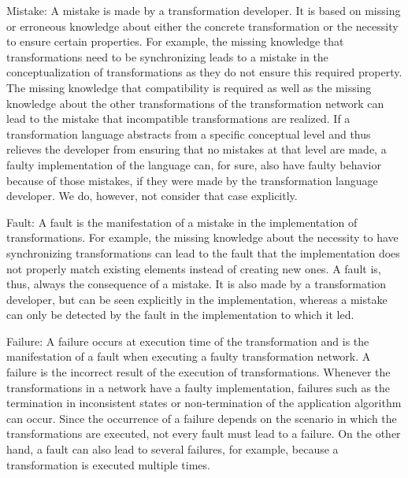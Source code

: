 \begin{properdescription}
    \item[Mistake:] 
    A mistake is made by a transformation developer. It is based on missing or erroneous knowledge about either the concrete transformation or the necessity to ensure certain properties. For example, the missing knowledge that transformations need to be synchronizing leads to a mistake in the conceptualization of transformations as they do not ensure this required property. The missing knowledge that compatibility is required as well as the missing knowledge about the other transformations of the transformation network can lead to the mistake that incompatible transformations are realized.
    If a transformation language abstracts from a specific conceptual level and thus relieves the developer from ensuring that no mistakes at that level are made, a faulty implementation of the language can, for sure, also have faulty behavior because of those mistakes, if they were made by the transformation language developer. We do, however, not consider that case explicitly. 
    \item[Fault:] 
    A fault is the manifestation of a mistake in the implementation of transformations. For example, the missing knowledge about the necessity to have synchronizing transformations can lead to the fault that the implementation does not properly match existing elements instead of creating new ones. A fault is, thus, always the consequence of a mistake. It is also made by a transformation developer, but can be seen explicitly in the implementation, whereas a mistake can only be detected by the fault in the implementation to which it led.
    \item[Failure:] 
    A failure occurs at execution time of the transformation and is the manifestation of a fault when executing a faulty transformation network. A failure is the incorrect result of the execution of transformations. Whenever the transformations in a network have a faulty implementation, failures such as the termination in inconsistent states or non-termination of the application algorithm can occur. Since the occurrence of a failure depends on the scenario in which the transformations are executed, not every fault must lead to a failure. On the other hand, a fault can also lead to several failures, for example, because a transformation is executed multiple times.
\end{properdescription}

